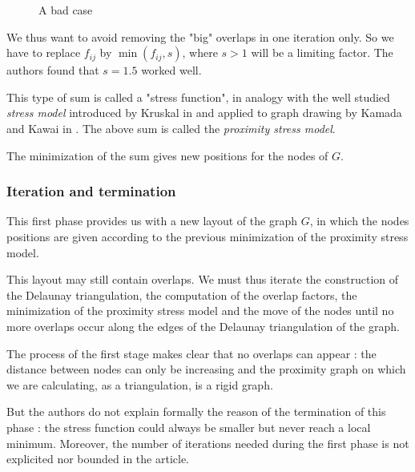 \documentclass[12pt]{report}
\begin{document}
\begin{figure}[h]
	\center
  \setlength\fboxsep{5pt}
  \setlength\fboxrule{0.5pt}
  \caption{A bad case}
  \label{badcase}
\end{figure}

We thus want to avoid removing the "big" overlaps in one iteration only.
So we have to replace $f_{ij}$ by $\min(f_{ij},s)$, where $s > 1$ will be a limiting factor. The authors found that $s = 1.5$ worked well.

This type of sum is called a "stress function", in analogy with the well studied \emph{stress model} introduced by Kruskal in \cite{Kruskal64} and applied to graph drawing by Kamada and Kawai in \cite{Kamada89}. 
The above sum is called the \emph{proximity stress model}.

\bigskip
The minimization of the sum gives new positions for the nodes of $G$.

\subsubsection{Iteration and termination}
This first phase provides us with a new layout of the graph $G$, in which the nodes positions are given according to the previous minimization of the proximity stress model.

This layout may still contain overlaps. We must thus iterate the construction of the Delaunay triangulation, the computation of the overlap factors, the minimization of the proximity stress model and the move of the nodes until no more overlaps occur along the edges of the Delaunay triangulation of the graph.

\bigskip
The process of the first stage makes clear that no overlaps can appear : the distance between nodes can only be increasing and the proximity graph on which we are calculating, as a triangulation, is a rigid graph.

But the authors do not explain formally the reason of the termination of this phase : the stress function could always be smaller but never reach a local minimum. Moreover, the number of iterations needed during the first phase is not explicited nor bounded in the article.
\end{document}
